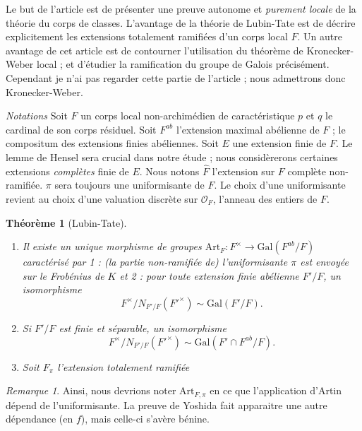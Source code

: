\documentclass[11.8pt]{amsart}
\theoremstyle{plain}
\newtheorem{thm}{Théorème}[section]
\theoremstyle{definition}
\theoremstyle{remark}
\newtheorem*{rmq}{Remarque}
\begin{document}
Le but de l'article est de présenter une preuve autonome et \textit{purement locale} de la théorie du corps de classes. L'avantage de la théorie de Lubin-Tate est de décrire explicitement les extensions totalement ramifiées d'un corps local $F$. Un autre avantage de cet article est de contourner l'utilisation du théorème de Kronecker-Weber local ; et d'étudier la ramification du groupe de Galois précisément. Cependant je n'ai pas regarder cette partie de l'article ; nous admettrons donc Kronecker-Weber.

\textsl{Notations} Soit $F$ un corps local non-archimédien de caractéristique $p$ et $q$ le cardinal de son corps résiduel. Soit $F^{ab}$ l'extension maximal abélienne de $F$ ; le compositum des extensions finies abéliennes. Soit $E$ une extension finie de $F$. Le lemme de Hensel sera crucial dans notre étude ; nous considèrerons certaines extensions \textit{complètes} finie de $E$. Nous notons $\hat F$ l'extension sur $F$ complète non-ramifiée. $\pi$ sera toujours une uniformisante de $F$. Le choix d'une uniformisante revient au choix d'une valuation discrète sur $\mathcal O_F$, l'anneau des entiers de $F$.    
\vspace{10pt}

\begin{thm}[Lubin-Tate] \begin{enumerate}
\item Il existe un unique morphisme de groupes $\mathrm{Art}_F : F^\times \to \mathrm{Gal}(F^{ab}/F)$ caractérisé par 1 : (la partie non-ramifiée de) l'uniformisante $\pi$ est envoyée sur le Frobénius de $K$ et 2 : pour toute extension finie \textit{abélienne} $F'/F$, un isomorphisme 
$$F^\times/N_{F'/F}(F'^\times) \sim \mathrm{Gal}(F'/F).$$ 
\item Si $F'/F$ est finie et séparable, un isomorphisme
$$F^\times/N_{F'/F}(F'^\times) \sim \mathrm{Gal}(F'\cap F^{ab}/F).$$ 
\item Soit $F_\pi$ l'extension totalement ramifiée 
\end{enumerate}
\end{thm}

\begin{rmq} Ainsi, nous devrions noter $\mathrm{Art}_{F,\pi}$ en ce que l'application d'Artin dépend de l'uniformisante. La preuve de Yoshida fait apparaitre une autre dépendance (en $f$), mais celle-ci s'avère bénine.
\end{rmq}
\vspace{10pt}
\end{document}
